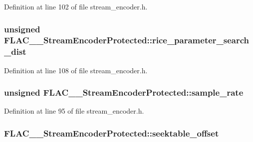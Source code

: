Definition at line 102 of file stream\+\_\+encoder.\+h.

\subsubsection[{\texorpdfstring{rice\+\_\+parameter\+\_\+search\+\_\+dist}{rice_parameter_search_dist}}]{\setlength{\rightskip}{0pt plus 5cm}unsigned F\+L\+A\+C\+\_\+\+\_\+\+Stream\+Encoder\+Protected\+::rice\+\_\+parameter\+\_\+search\+\_\+dist}\hypertarget{struct_f_l_a_c_____stream_encoder_protected_aefce1a8d6a6c456b73dc82ac4f15f842}{}\label{struct_f_l_a_c_____stream_encoder_protected_aefce1a8d6a6c456b73dc82ac4f15f842}


Definition at line 108 of file stream\+\_\+encoder.\+h.

\subsubsection[{\texorpdfstring{sample\+\_\+rate}{sample_rate}}]{\setlength{\rightskip}{0pt plus 5cm}unsigned F\+L\+A\+C\+\_\+\+\_\+\+Stream\+Encoder\+Protected\+::sample\+\_\+rate}\hypertarget{struct_f_l_a_c_____stream_encoder_protected_aa273a452d6e0acfb3ae21fa0348f4988}{}\label{struct_f_l_a_c_____stream_encoder_protected_aa273a452d6e0acfb3ae21fa0348f4988}


Definition at line 95 of file stream\+\_\+encoder.\+h.

\subsubsection[{\texorpdfstring{seektable\+\_\+offset}{seektable_offset}}]{ F\+L\+A\+C\+\_\+\+\_\+\+Stream\+Encoder\+Protected\+::seektable\+\_\+offset}\hypertarget{struct_f_l_a_c_____stream_encoder_protected_aafbb71f041c3ced3f8031440f2fad60d}{}\label{struct_f_l_a_c_____stream_encoder_protected_aafbb71f041c3ced3f8031440f2fad60d}


